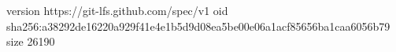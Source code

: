 version https://git-lfs.github.com/spec/v1
oid sha256:a38292de16220a929f41e4e1b5d9d08ea5be00e06a1acf85656ba1caa6056b79
size 26190
